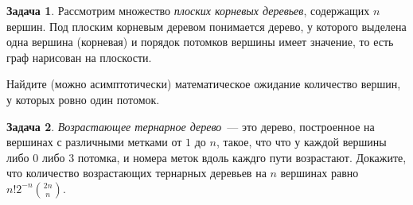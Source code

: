 \documentclass[a5paper]{article}
\theoremstyle{definition}
\newtheorem{problem}{Задача}
\begin{document}
\vspace{1cm}
\begin{problem}
    Рассмотрим множество \emph{плоских корневых деревьев}, содержащих \( n \)
вершин. Под плоским корневым деревом понимается дерево, у которого выделена одна
вершина (корневая) и порядок потомков вершины имеет значение, то есть граф
нарисован на плоскости.

Найдите (можно асимптотически) математическое ожидание количество вершин, у
которых ровно один потомок.
\end{problem}

\vspace{1cm}
\begin{problem}
\emph{Возрастающее тернарное дерево}~--- это дерево, построенное на вершинах с
различными метками от \( 1 \) до \( n \), такое, что что у каждой вершины
либо \( 0 \) либо \( 3 \) потомка, и номера меток вдоль каждго пути возрастают.
Докажите, что количество возрастающих тернарных деревьев на \( n \) вершинах 
равно \( n! 2^{-n} { 2n \choose n} \).
\end{problem}
\end{document}

